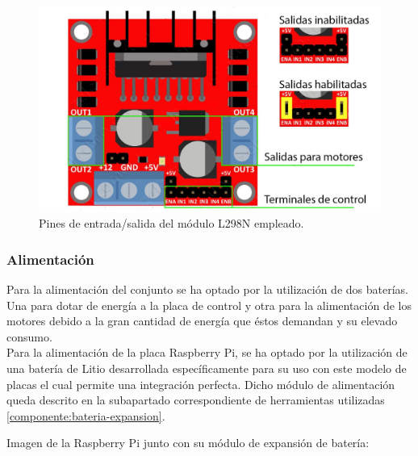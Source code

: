 \begin{figure}[H]
  \begin{center}
    \includegraphics[scale=2]{imagenes/L298N-conexiones.jpg}
  \end{center}
  \caption{Pines de entrada/salida del módulo L298N empleado.}
  \label{diagrama:L298N-salidas}
\end{figure}

\subsubsection{Alimentación}

Para la alimentación del conjunto se ha optado por la utilización de dos baterías. Una para dotar de energía a la placa de control y otra para la alimentación de los motores debido a la gran cantidad de energía 
que éstos demandan y su elevado consumo.\\

Para la alimentación de la placa Raspberry Pi, se ha optado por la utilización de una batería de Litio desarrollada específicamente para su uso con este modelo de placas el cual permite una integración
perfecta. Dicho módulo de alimentación queda descrito en la subapartado correspondiente de herramientas utilizadas \ref{componente:bateria-expansion}.

Imagen de la Raspberry Pi junto con su módulo de expansión de batería:

